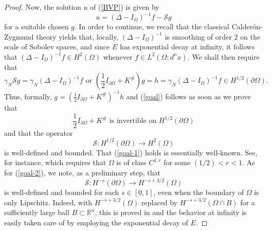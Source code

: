 \documentclass[reqno,10pt, centertags]{amsart}
\newcommand{\bbR}{{\mathbb{R}}}
\newcommand{\ga}{\gamma}
\newcommand{\Om}{\Omega}
\newcommand{\dOm}{{\partial\Omega}}
\numberwithin{equation}{section}
\theoremstyle{definition}
\begin{document}
\begin{proof}
Now, the solution $u$ of (\ref{BVP}) is given by
\begin{equation}\label{sol}
u=(\Delta-I_{\Omega})^{-1}f-{\mathcal S}g
\end{equation}
for a suitable chosen $g$. In order to continue, we recall that the
classical Calder\'on-Zygmund theory yields that, locally,
$(\Delta-I_{\Omega})^{-1}$ is smoothing of order $2$ on the scale of
Sobolev spaces, and since $E$ has exponential decay at infinity, it
follows that $(\Delta-I_{\Omega})^{-1}f\in H^{2}(\Omega)$ whenever $f\in
L^2(\Omega;d^nx)$. We shall then require that
\begin{equation}
\ga_N{\mathcal S}g=\ga_N (\Delta-I_{\Omega})^{-1}f \mbox{ or }
({\textstyle{\frac12}}I_\dOm+K^{\#})g=h= \ga_N
(\Delta-I_{\Omega})^{-1}f\in H^{1/2}(\partial\Omega).
\end{equation}
Thus, formally, $g=(\frac12 I_\dOm+K^{\#})^{-1}h$ and (\ref{goal})
follows as soon as we prove that
\begin{equation}\label{goal-1}
{\textstyle{\frac12}}I_\dOm+K^{\#}\mbox{ is invertible on }
H^{1/2}(\partial\Omega)
\end{equation}
and that the operator
\begin{equation}\label{goal-2}
{\mathcal S}\colon H^{1/2}(\partial\Omega)\rightarrow
H^{2}(\Omega)
\end{equation}
is well-defined and bounded. That (\ref{goal-1}) holds is essentially
well-known. See, for instance, \cite[Proposition 4.5]{Ta96}
which requires that $\Om$ is of class $C^{1,r}$ for some
$(1/2)<r<1$. As for (\ref{goal-2}), we note, as a preliminary step,
that
\begin{equation}\label{S-map}
{\mathcal S}\colon H^{-s}(\partial\Omega)\rightarrow
H^{-s+3/2}(\Omega)
\end{equation}
is well-defined and bounded for each $s\in [0,1]$, even when the
boundary of $\Omega$ is only Lipschitz. Indeed, with
$H^{-s+3/2}(\Omega)$ replaced by $H^{-s+3/2}(\Omega\cap B)$ for a
sufficiently large ball $B\subset\bbR^n$, this is proved in \cite{MT00} and
the behavior at infinity is easily taken care of by employing the
exponential decay of $E$.


\end{proof}
\end{document}
